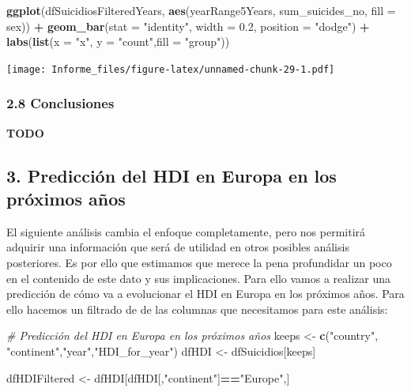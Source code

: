 \documentclass[]{article}
\newenvironment{Shaded}{\begin{snugshade}}{\end{snugshade}}
\newcommand{\CommentTok}[1]{\textcolor[rgb]{0.56,0.35,0.01}{\textit{#1}}}
\newcommand{\DataTypeTok}[1]{\textcolor[rgb]{0.13,0.29,0.53}{#1}}
\newcommand{\FloatTok}[1]{\textcolor[rgb]{0.00,0.00,0.81}{#1}}
\newcommand{\KeywordTok}[1]{\textcolor[rgb]{0.13,0.29,0.53}{\textbf{#1}}}
\newcommand{\NormalTok}[1]{#1}
\newcommand{\OperatorTok}[1]{\textcolor[rgb]{0.81,0.36,0.00}{\textbf{#1}}}
\newcommand{\StringTok}[1]{\textcolor[rgb]{0.31,0.60,0.02}{#1}}
\begin{document}
\begin{Shaded}
\begin{Highlighting}[]
\KeywordTok{ggplot}\NormalTok{(dfSuicidiosFilteredYears, }\KeywordTok{aes}\NormalTok{(yearRange5Years, sum_suicides_no, }\DataTypeTok{fill =}\NormalTok{ sex)) }\OperatorTok{+}\StringTok{ }\KeywordTok{geom_bar}\NormalTok{(}\DataTypeTok{stat =} \StringTok{"identity"}\NormalTok{, }\DataTypeTok{width =} \FloatTok{0.2}\NormalTok{, }\DataTypeTok{position =} \StringTok{"dodge"}\NormalTok{) }\OperatorTok{+}\StringTok{ }\KeywordTok{labs}\NormalTok{(}\KeywordTok{list}\NormalTok{(}\DataTypeTok{x =} \StringTok{"x"}\NormalTok{, }\DataTypeTok{y =} \StringTok{"count"}\NormalTok{,}\DataTypeTok{fill =} \StringTok{"group"}\NormalTok{))}
\end{Highlighting}
\end{Shaded}

\texttt{[image: Informe\_files/figure-latex/unnamed-chunk-29-1.pdf]}

\hypertarget{conclusiones}{%
\subsubsection{2.8 Conclusiones}\label{conclusiones}}

\textbf{TODO}

\hypertarget{prediccion-del-hdi-en-europa-en-los-proximos-anos}{%
\subsection{3. Predicción del HDI en Europa en los próximos
años}\label{prediccion-del-hdi-en-europa-en-los-proximos-anos}}

El siguiente análisis cambia el enfoque completamente, pero nos
permitirá adquirir una información que será de utilidad en otros
posibles análisis posteriores. Es por ello que estimamos que merece la
pena profundidar un poco en el contenido de este dato y sus
implicaciones. Para ello vamos a realizar una predicción de cómo va a
evolucionar el HDI en Europa en los próximos años. Para ello hacemos un
ﬁltrado de de las columnas que necesitamos para este análisis:

\begin{Shaded}
\begin{Highlighting}[]
\CommentTok{# Predicción del HDI en Europa en los próximos años}
\NormalTok{keeps <-}\StringTok{ }\KeywordTok{c}\NormalTok{(}\StringTok{"country"}\NormalTok{, }\StringTok{"continent"}\NormalTok{,}\StringTok{"year"}\NormalTok{,}\StringTok{"HDI_for_year"}\NormalTok{)}
\NormalTok{dfHDI <-}\StringTok{ }\NormalTok{dfSuicidios[keeps]}

\NormalTok{dfHDIFiltered <-}\StringTok{ }\NormalTok{dfHDI[dfHDI[,}\StringTok{"continent"}\NormalTok{]}\OperatorTok{==}\StringTok{"Europe"}\NormalTok{,]}
\end{Highlighting}
\end{Shaded}
\end{document}
